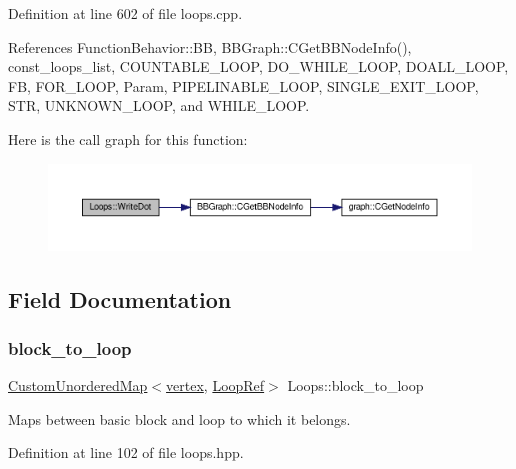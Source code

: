 Definition at line 602 of file loops.\+cpp.



References Function\+Behavior\+::\+BB, B\+B\+Graph\+::\+C\+Get\+B\+B\+Node\+Info(), const\+\_\+loops\+\_\+list, C\+O\+U\+N\+T\+A\+B\+L\+E\+\_\+\+L\+O\+OP, D\+O\+\_\+\+W\+H\+I\+L\+E\+\_\+\+L\+O\+OP, D\+O\+A\+L\+L\+\_\+\+L\+O\+OP, FB, F\+O\+R\+\_\+\+L\+O\+OP, Param, P\+I\+P\+E\+L\+I\+N\+A\+B\+L\+E\+\_\+\+L\+O\+OP, S\+I\+N\+G\+L\+E\+\_\+\+E\+X\+I\+T\+\_\+\+L\+O\+OP, S\+TR, U\+N\+K\+N\+O\+W\+N\+\_\+\+L\+O\+OP, and W\+H\+I\+L\+E\+\_\+\+L\+O\+OP.

Here is the call graph for this function\+:
\nopagebreak
\begin{figure}[H]
\begin{center}
\leavevmode
\includegraphics[width=350pt]{d3/ded/classLoops_a52664116b60c75c5a56eaf38317e0d94_cgraph}
\end{center}
\end{figure}


\subsection{Field Documentation}
\mbox{\label{classLoops_aad1cb53edf1df5649650f1f4d991bf82}} 
\subsubsection{\texorpdfstring{block\+\_\+to\+\_\+loop}{block\_to\_loop}}
{\footnotesize\ttfamily \hyperlink{custom__map_8hpp_ad1ed68f2ff093683ab1a33522b144adc}{Custom\+Unordered\+Map}$<$\hyperlink{graph_8hpp_abefdcf0544e601805af44eca032cca14}{vertex}, \hyperlink{loop_8hpp_aa4a60313089619376f67557c4120423c}{Loop\+Ref}$>$ Loops\+::block\+\_\+to\+\_\+loop\hspace{0.3cm}{\ttfamily [private]}}



Maps between basic block and loop to which it belongs. 



Definition at line 102 of file loops.\+hpp.



